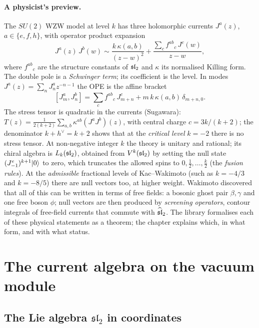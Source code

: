 \paragraph{A physicist's preview.}
The $SU(2)$ WZW model at level $k$ has three holomorphic currents $J^a(z)$, $a\in\{e,f,h\}$, with
operator product expansion
\begin{equation}\label{l08:eq:JJ}
  J^a(z)\,J^b(w) \sim \frac{k\,\kappa(a,b)}{(z-w)^2} + \frac{\sum_c f^{ab}{}_c\,J^c(w)}{z-w},
\end{equation}
where $f^{ab}{}_c$ are the structure constants of $\mathfrak{sl}_2$ and $\kappa$ its normalised Killing form.
The double pole is a \emph{Schwinger term}; its coefficient is the level. In modes
$J^a(z) = \sum_n J^a_n z^{-n-1}$ the OPE is the affine bracket
\begin{equation}\label{l08:eq:affine}
  [J^a_m, J^b_n] = \sum_c f^{ab}{}_c\, J^c_{m+n} + m\,k\,\kappa(a,b)\,\delta_{m+n,0}.
\end{equation}
The stress tensor is quadratic in the currents (Sugawara):
$T(z) = \frac{1}{2(k+2)}\sum_{a,b}\kappa^{ab}(J^aJ^b)(z)$, with central charge $c = 3k/(k+2)$; the
denominator $k+h^\vee = k+2$ shows that at the \emph{critical level} $k=-2$ there is no stress tensor.
At non-negative integer $k$ the theory is unitary and rational; its chiral algebra is $L_k(\mathfrak{sl}_2)$,
obtained from $V^k(\mathfrak{sl}_2)$ by setting the null state $(J^e_{-1})^{k+1}|0\rangle$ to zero, which
truncates the allowed spins to $0,\frac12,\ldots,\frac k2$ (the \emph{fusion rules}). At the
\emph{admissible} fractional levels of Kac--Wakimoto (such as $k=-4/3$ and $k=-8/5$) there are null
vectors too, at higher weight. Wakimoto discovered that all of this can be written in terms of free
fields: a bosonic ghost pair $\beta,\gamma$ and one free boson $\phi$; null vectors are then produced by
\emph{screening operators}, contour integrals of free-field currents that commute with
$\widehat{\mathfrak{sl}}_2$. The library formalises each of these physical statements as a theorem; the chapter
explains which, in what form, and with what status.

\section{The current algebra on the vacuum module}\label{l08:sec:currents}

\subsection{The Lie algebra \texorpdfstring{$\mathfrak{sl}_2$}{sl(2)} in coordinates}

